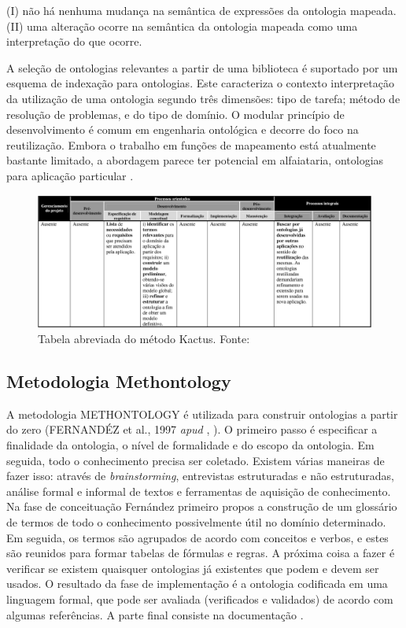(I) não há nenhuma mudança na semântica de expressões da ontologia mapeada.
(II) uma alteração ocorre na semântica da ontologia mapeada como uma interpretação do que ocorre.

A seleção de ontologias relevantes a partir de uma biblioteca é suportado por um esquema de indexação para ontologias.
Este caracteriza o contexto interpretação da utilização de uma ontologia segundo três dimensões: tipo de tarefa; método
de resolução de problemas, e do tipo de domínio. O modular princípio de desenvolvimento é comum em engenharia ontológica
e decorre do foco na reutilização. Embora o trabalho em funções de mapeamento está atualmente bastante limitado, a
abordagem parece ter potencial em alfaiataria, ontologias para aplicação particular \cite{VariosAutores2009}. 

\pagebreak

\begin{figure}[h] 
\centering 
\includegraphics[scale=0.4]{Figuras/7.png} 
\caption[Tabela abreviada do método Kactus]{Tabela abreviada do método Kactus. Fonte: \cite{DanielaLucas2008}}
\end{figure}
 
\subsection{Metodologia Methontology} 
 
 A metodologia METHONTOLOGY é utilizada para construir ontologias a partir do zero 
 (FERNANDÉZ et al., 1997 \textit{apud} \citeauthor{}, \citeyear{}).
 O primeiro passo é especificar a finalidade da ontologia, o nível de formalidade e do escopo da ontologia.
 Em seguida, todo o conhecimento precisa ser coletado. Existem várias maneiras de fazer isso: através de \textit{brainstorming},
 entrevistas estruturadas e não estruturadas, análise formal e informal de textos e ferramentas de aquisição de conhecimento.
 Na fase de conceituação Fernández  primeiro propos a construção de um glossário de termos de todo o conhecimento
 possivelmente útil no domínio determinado. Em seguida, os termos são agrupados de acordo com conceitos e verbos,
 e estes são reunidos para formar tabelas de fórmulas e regras. A próxima coisa a fazer é verificar se existem quaisquer
 ontologias já existentes que podem e devem ser usados. O resultado da fase de implementação é a ontologia codificada em 
 uma linguagem formal, que pode ser avaliada (verificados e validados) de acordo com algumas referências. A parte final
 consiste na documentação \cite{VariosAutores2009}.
 
